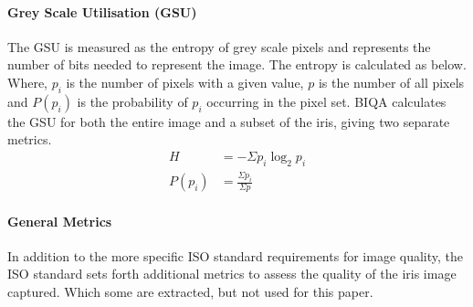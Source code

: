 \paragraph{Grey Scale Utilisation (GSU)}
The GSU is measured as the entropy of grey scale pixels and represents
the number of bits needed to represent the image.  The entropy is calculated as
below. Where, $p_i$ is the number of pixels with a given value, $p$ is the
number of all pixels and $P(p_i)$ is the probability of $p_i$ occurring in the 
pixel set.  BIQA calculates the GSU for both the entire image and a subset of 
the iris, giving two separate metrics.
\begin{align}
	H &= -\Sigma p_i \log_2 p_i \\
	P(p_i) &= \frac{ \Sigma{p_i} }{ \Sigma{p} }
\end{align}



\paragraph{General Metrics}
In addition to the more specific ISO standard requirements for image quality,
the ISO standard\cite{iso} sets forth additional metrics to assess the quality
of the iris image captured.  Which some are extracted, but not used for this
paper.


